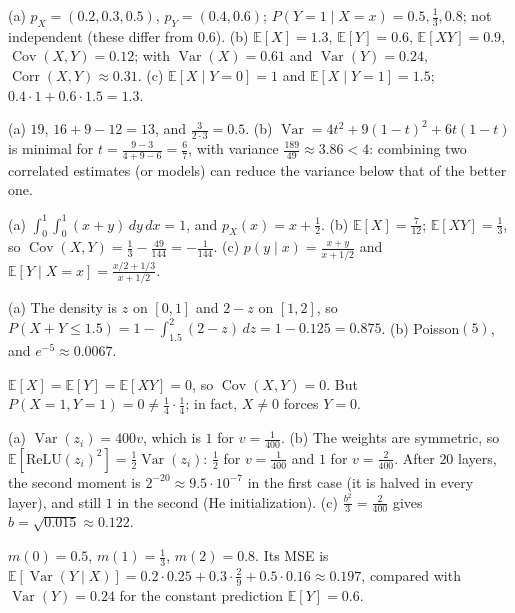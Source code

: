 \documentclass[11pt]{article}
\newcommand{\E}{\mathbb{E}}
\DeclareMathOperator{\Var}{Var}
\DeclareMathOperator{\Cov}{Cov}
\DeclareMathOperator{\Corr}{Corr}
\begin{document}
\begin{description}[leftmargin=0pt, itemsep=0.3em]
    \item[\ref{pr:joint-table}.] (a) $p_X = (0.2, 0.3, 0.5)$, $p_Y = (0.4, 0.6)$; $P(Y = 1 \mid X = x) = 0.5, \frac{1}{3}, 0.8$; not independent (these differ from $0.6$). (b) $\E[X] = 1.3$, $\E[Y] = 0.6$, $\E[XY] = 0.9$, $\Cov(X, Y) = 0.12$; with $\Var(X) = 0.61$ and $\Var(Y) = 0.24$, $\Corr(X, Y) \approx 0.31$. (c) $\E[X \mid Y = 0] = 1$ and $\E[X \mid Y = 1] = 1.5$; $0.4 \cdot 1 + 0.6 \cdot 1.5 = 1.3$.
    \item[\ref{pr:portfolio}.] (a) $19$, $16 + 9 - 12 = 13$, and $\frac{3}{2 \cdot 3} = 0.5$. (b) $\Var = 4t^2 + 9(1 - t)^2 + 6t(1 - t)$ is minimal for $t = \frac{9 - 3}{4 + 9 - 6} = \frac{6}{7}$, with variance $\frac{189}{49} \approx 3.86 < 4$: combining two correlated estimates (or models) can reduce the variance below that of the better one.
    \item[\ref{pr:continuous-joint}.] (a) $\int_0^1\int_0^1 (x + y)\, dy\, dx = 1$, and $p_X(x) = x + \frac{1}{2}$. (b) $\E[X] = \frac{7}{12}$; $\E[XY] = \frac{1}{3}$, so $\Cov(X, Y) = \frac{1}{3} - \frac{49}{144} = -\frac{1}{144}$. (c) $p(y \mid x) = \frac{x + y}{x + 1/2}$ and $\E[Y \mid X = x] = \frac{x/2 + 1/3}{x + 1/2}$.
    \item[\ref{pr:convolution}.] (a) The density is $z$ on $[0, 1]$ and $2 - z$ on $[1, 2]$, so $P(X + Y \leq 1.5) = 1 - \int_{1.5}^2 (2 - z)\, dz = 1 - 0.125 = 0.875$. (b) Poisson$(5)$, and $e^{-5} \approx 0.0067$.
    \item[\ref{pr:uncorrelated-dependent}.] $\E[X] = \E[Y] = \E[XY] = 0$, so $\Cov(X, Y) = 0$. But $P(X = 1, Y = 1) = 0 \neq \frac{1}{4} \cdot \frac{1}{4}$; in fact, $X \neq 0$ forces $Y = 0$.
    \item[\ref{pr:init-layer}.] (a) $\Var(z_i) = 400v$, which is $1$ for $v = \frac{1}{400}$. (b) The weights are symmetric, so $\E[\mathrm{ReLU}(z_i)^2] = \frac{1}{2}\Var(z_i)$: $\frac{1}{2}$ for $v = \frac{1}{400}$ and $1$ for $v = \frac{2}{400}$. After $20$ layers, the second moment is $2^{-20} \approx 9.5 \cdot 10^{-7}$ in the first case (it is halved in every layer), and still $1$ in the second (He initialization). (c) $\frac{b^2}{3} = \frac{2}{400}$ gives $b = \sqrt{0.015} \approx 0.122$.
    \item[\ref{pr:best-predictor}.] $m(0) = 0.5$, $m(1) = \frac{1}{3}$, $m(2) = 0.8$. Its MSE is $\E[\Var(Y \mid X)] = 0.2 \cdot 0.25 + 0.3 \cdot \frac{2}{9} + 0.5 \cdot 0.16 \approx 0.197$, compared with $\Var(Y) = 0.24$ for the constant prediction $\E[Y] = 0.6$.

\end{description}
\end{document}
